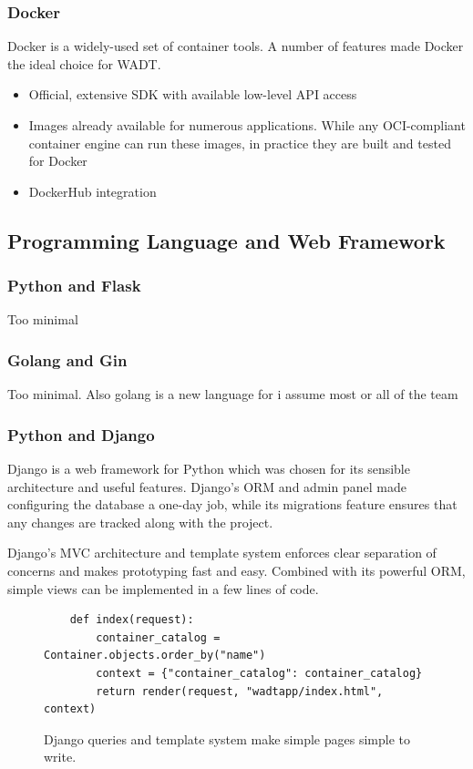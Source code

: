 \documentclass[12pt]{article}
\begin{document}
\subsubsection{Docker}
Docker is a widely-used set of container tools. A number of features made Docker the ideal choice for WADT.
\begin{itemize}
	\item Official, extensive SDK with available low-level API access
	\item Images already available for numerous applications. While any OCI-compliant container engine can run these images, in practice they are built and tested for Docker
	\item DockerHub integration
\end{itemize}

\subsection{Programming Language and Web Framework}

\subsubsection{Python and Flask}
Too minimal

\subsubsection{Golang and Gin}
Too minimal. Also golang is a new language for i assume most or all of the team

\subsubsection{Python and Django}
Django is a web framework for Python which was chosen for its sensible architecture and useful features. Django's ORM and admin panel made configuring the database a one-day job, while its migrations feature ensures that any changes are tracked along with the project.

Django's MVC architecture and template system enforces clear separation of concerns and makes prototyping fast and easy. Combined with its powerful ORM, simple views can be implemented in a few lines of code.
\begin{figure}[H]
	\centering
	\begin{verbatim}
	def index(request):
	    container_catalog = Container.objects.order_by("name")
	    context = {"container_catalog": container_catalog}
	    return render(request, "wadtapp/index.html", context)
	\end{verbatim}
	\caption{Django queries and template system make simple pages simple to write.}
	\label{fig:indexview}
\end{figure}
\end{document}
